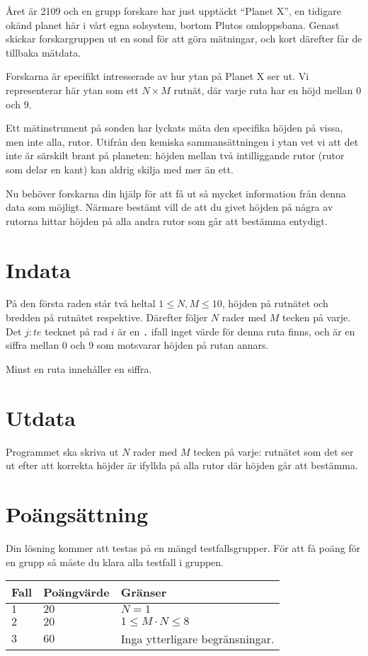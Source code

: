 Året är 2109 och en grupp forskare har just upptäckt ``Planet X'', 
en tidigare okänd planet här i vårt egna solsystem,
bortom Plutos omloppsbana. Genast skickar forskargruppen ut
en sond för att göra mätningar, och kort därefter får de tillbaka mätdata.

Forskarna är specifikt intresserade av hur ytan på Planet X ser ut.
Vi representerar här ytan som ett $N \times M$ rutnät, där varje ruta
har en höjd mellan $0$ och $9$.

Ett mätinstrument på sonden har lyckats mäta den specifika höjden
på vissa, men inte alla, rutor. Utifrån den kemiska sammansättningen i ytan vet vi att det inte 
är särskilt brant på planeten: höjden mellan två
intilliggande rutor (rutor som delar en kant) kan aldrig skilja 
med mer än ett. 

Nu behöver forskarna din hjälp för att få ut så mycket information
från denna data som möjligt. Närmare bestämt vill de att du givet höjden
på några av rutorna hittar höjden på alla andra rutor som går att bestämma entydigt.

\section*{Indata}
På den första raden står två heltal $1 \le N,M \le 10$, 
höjden på rutnätet och bredden på rutnätet respektive.
Därefter följer $N$ rader med $M$ tecken på varje.
Det $j:te$ tecknet på rad $i$ är en \texttt{.} ifall
inget värde för denna ruta finns, och är en siffra mellan
$0$ och $9$ som motsvarar höjden på rutan annars.

Minst en ruta innehåller en siffra.

\section*{Utdata}
Programmet ska skriva ut $N$ rader med $M$ tecken på varje:
rutnätet som det ser ut efter att
korrekta höjder är ifyllda på alla rutor där höjden går att bestämma.

\section*{Poängsättning}
Din lösning kommer att testas på en mängd testfallsgrupper.
För att få poäng för en grupp så måste du klara alla testfall i gruppen.

\noindent
\begin{tabular}{| l | l | l |}
  \hline
  Fall & Poängvärde & Gränser \\ \hline
  $1$    & $20$        &  $N = 1$\\ \hline 
  $2$    & $20$        &  $1 \leq M \cdot N \leq 8$\\ \hline 
  $3$    & $60$        &  Inga ytterligare begränsningar. \\ \hline
\end{tabular}

